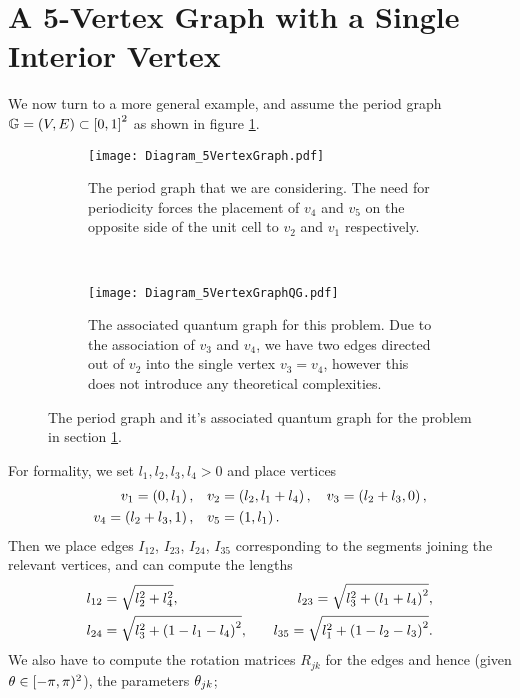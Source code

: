 \section{A 5-Vertex Graph with a Single Interior Vertex} \label{sec:ExampleGeneralLengths}
We now turn to a more general example, and assume the period graph $\mathbb{G}=\left( V,E \right)\subset\left[ 0,1 \right]^2$ as shown in figure \ref{fig:Diagram_5VertexGraph}.
\begin{figure}[b!]
	\begin{subfigure}[b]{0.45\textwidth}
		\centering
		\texttt{[image: Diagram\_5VertexGraph.pdf]}
		\caption{\label{fig:Diagram_5VertexGraph} The period graph that we are considering. The need for periodicity forces the placement of $v_4$ and $v_5$ on the opposite side of the unit cell to $v_2$ and $v_1$ respectively.}
	\end{subfigure}
	~
	\begin{subfigure}[b]{0.45\textwidth}
		\centering
		\texttt{[image: Diagram\_5VertexGraphQG.pdf]}
		\caption{\label{fig:Diagram_5VertexGraphQG} The associated quantum graph for this problem. Due to the association of $v_3$ and $v_4$, we have two edges directed out of $v_2$ into the single vertex $v_3=v_4$, however this does not introduce any theoretical complexities.}
	\end{subfigure}
	\caption{\label{fig:GeneralLengthsDiagrams} The period graph and it's associated quantum graph for the problem in section \ref{sec:ExampleGeneralLengths}. }
\end{figure}
For formality, we set $l_1,l_2,l_3,l_4>0$ and place vertices
\begin{align*}
	v_1 = \left( 0,l_1 \right), &\quad v_2 = \left( l_2,l_1+l_4 \right), \quad v_3 = \left( l_2+l_3, 0 \right), \\
	v_4 = \left( l_2+l_3, 1 \right), &\quad v_5 = \left( 1, l_1 \right).
\end{align*}
Then we place edges $I_{12}$, $I_{23}$, $I_{24}$, $I_{35}$ corresponding to the segments joining the relevant vertices, and can compute the lengths
\begin{align*}
	l_{12} &= \sqrt{l_2^2 + l_4^2}, &\quad l_{23} = \sqrt{l_3^2+\left( l_1+l_4 \right)^2}, \\
	l_{24} &= \sqrt{l_3^2 + \left( 1-l_1-l_4 \right)^2}, &\quad l_{35} = \sqrt{l_1^2+\left( 1-l_2-l_3 \right)^2}.
\end{align*}
We also have to compute the rotation matrices $R_{jk}$ for the edges and hence (given $\theta\in[-\pi,\pi)^2$), the parameters $\theta_{jk}$;
